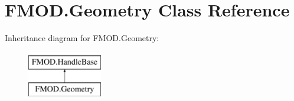\hypertarget{class_f_m_o_d_1_1_geometry}{}\section{F\+M\+O\+D.\+Geometry Class Reference}
\label{class_f_m_o_d_1_1_geometry}
Inheritance diagram for F\+M\+O\+D.\+Geometry\+:\begin{figure}[H]
\begin{center}
\leavevmode
\includegraphics[height=2.000000cm]{class_f_m_o_d_1_1_geometry}
\end{center}
\end{figure}
